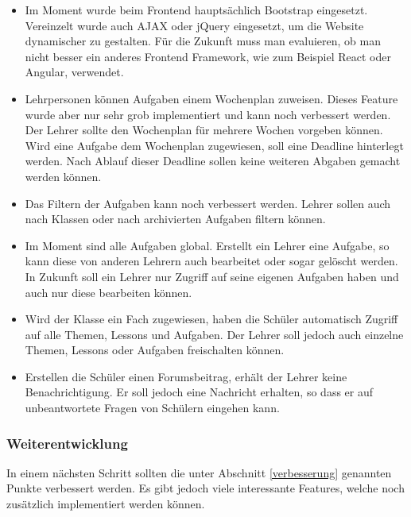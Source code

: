 \begin{itemize}
	\item Im Moment wurde beim Frontend hauptsächlich Bootstrap eingesetzt. Vereinzelt wurde auch AJAX oder jQuery eingesetzt, um die Website dynamischer zu gestalten. Für die Zukunft muss man evaluieren, ob man nicht besser ein anderes Frontend Framework, wie zum Beispiel React oder Angular, verwendet.
	\item Lehrpersonen können Aufgaben einem Wochenplan zuweisen. Dieses Feature wurde aber nur sehr grob implementiert und kann noch verbessert werden. Der Lehrer sollte den Wochenplan für mehrere Wochen vorgeben können. Wird eine Aufgabe dem Wochenplan zugewiesen, soll eine Deadline hinterlegt werden. Nach Ablauf dieser Deadline sollen keine weiteren Abgaben gemacht werden können.
	\item Das Filtern der Aufgaben kann noch verbessert werden. Lehrer sollen auch nach Klassen oder nach archivierten Aufgaben filtern können.
	\item Im Moment sind alle Aufgaben global. Erstellt ein Lehrer eine Aufgabe, so kann diese von anderen Lehrern auch bearbeitet oder sogar gelöscht werden. In Zukunft soll ein Lehrer nur Zugriff auf seine eigenen Aufgaben haben und auch nur diese bearbeiten können.
	\item Wird der Klasse ein Fach zugewiesen, haben die Schüler automatisch Zugriff auf alle Themen, Lessons und Aufgaben. Der Lehrer soll jedoch auch einzelne Themen, Lessons oder Aufgaben freischalten können.
	\item Erstellen die Schüler einen Forumsbeitrag, erhält der Lehrer keine Benachrichtigung. Er soll jedoch eine Nachricht erhalten, so dass er auf unbeantwortete Fragen von Schülern eingehen kann.
\end{itemize}

\newpage

\subsubsection{Weiterentwicklung}
In einem nächsten Schritt sollten die unter Abschnitt \ref{verbesserung} genannten Punkte verbessert werden. Es gibt jedoch viele interessante Features, welche noch zusätzlich implementiert werden können.

